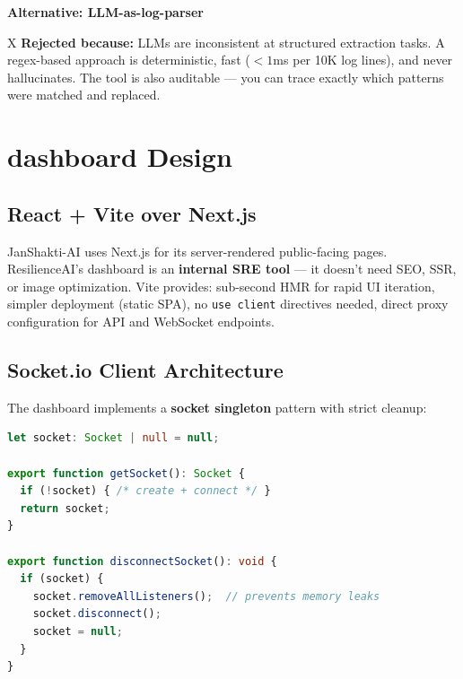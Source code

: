 \documentclass[11pt,a4paper]{article}
\begin{document}
\begin{alternativebox}
\textbf{Alternative: LLM-as-log-parser}

X \textbf{Rejected because:} LLMs are inconsistent at structured extraction tasks. A regex-based approach is deterministic, fast ($<1$ms per 10K log lines), and never hallucinates. The tool is also auditable — you can trace exactly which patterns were matched and replaced.
\end{alternativebox}

\section{dashboard Design}

\subsection{React + Vite over Next.js}

\begin{decisionbox}
JanShakti-AI uses Next.js for its server-rendered public-facing pages. ResilienceAI's
dashboard is an \textbf{internal SRE tool} — it doesn't need SEO, SSR, or image optimization.
Vite provides: sub-second HMR for rapid UI iteration, simpler deployment (static SPA),
no \texttt{use client} directives needed, direct proxy configuration for API and WebSocket endpoints.
\end{decisionbox}

\subsection{Socket.io Client Architecture}

The dashboard implements a \textbf{socket singleton} pattern with strict cleanup:

\begin{lstlisting}[language=TypeScript, caption=Socket singleton with cleanup contract]
let socket: Socket | null = null;

export function getSocket(): Socket {
  if (!socket) { /* create + connect */ }
  return socket;
}

export function disconnectSocket(): void {
  if (socket) {
    socket.removeAllListeners();  // prevents memory leaks
    socket.disconnect();
    socket = null;
  }
}
\end{lstlisting}
\end{document}
